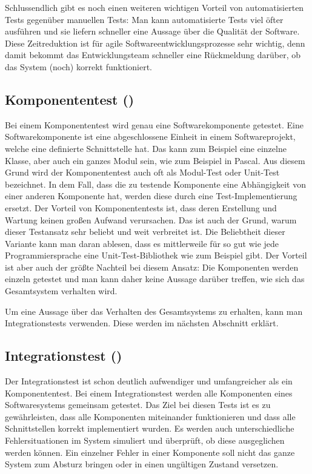 \SuperPar
Schlussendlich gibt es noch einen weiteren wichtigen Vorteil von automatisierten Tests gegenüber manuellen Tests: Man kann automatisierte Tests viel öfter ausführen und sie liefern schneller eine Aussage über die Qualität der Software. Diese Zeitreduktion ist für agile Softwareentwicklungsprozesse sehr wichtig, denn damit bekommt das Entwicklungsteam schneller eine Rückmeldung darüber, ob das System (noch) korrekt funktioniert. 


\subsection{Komponententest ()}

Bei einem Komponententest \cite{xUnit} wird genau eine Softwarekomponente getestet. Eine Softwarekomponente ist eine abgeschlossene Einheit in einem Softwareprojekt, welche eine definierte Schnittstelle hat. Das kann zum Beispiel eine einzelne Klasse, aber auch ein ganzes Modul sein, wie zum Beispiel in Pascal. Aus diesem Grund wird der Komponententest auch oft als Modul-Test oder Unit-Test bezeichnet. In dem Fall, dass die zu testende Komponente eine Abhängigkeit von einer anderen Komponente hat, werden diese durch eine Test-Implementierung ersetzt. Der Vorteil von Komponententests ist, dass deren Erstellung und Wartung keinen großen Aufwand verursachen. Das ist auch der Grund, warum dieser Testansatz sehr beliebt und weit verbreitet ist. Die Beliebtheit dieser Variante kann man daran ablesen, dass es mittlerweile für so gut wie jede Programmiersprache eine Unit-Test-Bibliothek wie zum Beispiel  \cite{JUnit} gibt. Der Vorteil ist aber auch der größte Nachteil bei diesem Ansatz: Die Komponenten werden einzeln getestet und man kann daher keine Aussage darüber treffen, wie sich das Gesamtsystem verhalten wird.

\SuperPar
Um eine Aussage über das Verhalten des Gesamtsystems zu erhalten, kann man Integrationstests verwenden. Diese werden im nächsten Abschnitt erklärt.

\subsection{Integrationstest ()}

Der Integrationstest ist schon deutlich aufwendiger und umfangreicher als ein Komponententest. Bei einem Integrationstest werden alle Komponenten eines Softwaresystems gemeinsam getestet. Das Ziel bei diesen Tests ist es zu gewährleisten, dass alle Komponenten miteinander funktionieren und dass alle Schnittstellen korrekt implementiert wurden. Es werden auch unterschiedliche Fehlersituationen im System simuliert und überprüft, ob diese ausgeglichen werden können. Ein einzelner Fehler in einer Komponente soll nicht das ganze System zum Absturz bringen oder in einen ungültigen Zustand versetzen.


